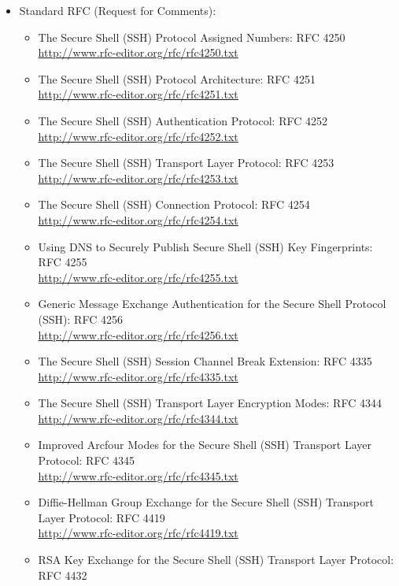\begin{itemize}
\begin{itemize}
\item Standard RFC (Request for Comments): \\
\begin{itemize}
\item The Secure Shell (SSH) Protocol Assigned Numbers: RFC 4250\\
\url{http://www.rfc-editor.org/rfc/rfc4250.txt}
\item The Secure Shell (SSH) Protocol Architecture: RFC 4251\\
\url{http://www.rfc-editor.org/rfc/rfc4251.txt}
\item The Secure Shell (SSH) Authentication Protocol: RFC 4252\\
\url{http://www.rfc-editor.org/rfc/rfc4252.txt}
\item The Secure Shell (SSH) Transport Layer Protocol: RFC 4253\\
\url{http://www.rfc-editor.org/rfc/rfc4253.txt}
\item The Secure Shell (SSH) Connection Protocol: RFC 4254\\
\url{http://www.rfc-editor.org/rfc/rfc4254.txt}
\item Using DNS to Securely Publish Secure Shell (SSH) Key Fingerprints: RFC 4255\\
\url{http://www.rfc-editor.org/rfc/rfc4255.txt}
\item Generic Message Exchange Authentication for the Secure Shell Protocol (SSH): RFC 4256\\
\url{http://www.rfc-editor.org/rfc/rfc4256.txt}
\item The Secure Shell (SSH) Session Channel Break Extension: RFC 4335\\
\url{http://www.rfc-editor.org/rfc/rfc4335.txt}
\item The Secure Shell (SSH) Transport Layer Encryption Modes: RFC 4344\\
\url{http://www.rfc-editor.org/rfc/rfc4344.txt}
\item Improved Arcfour Modes for the Secure Shell (SSH) Transport 
Layer Protocol: RFC 4345\\
\url{http://www.rfc-editor.org/rfc/rfc4345.txt}
\item Diffie-Hellman Group Exchange for the Secure Shell (SSH) 
Transport Layer Protocol: RFC 4419\\
\url{http://www.rfc-editor.org/rfc/rfc4419.txt}
\item RSA Key Exchange for the Secure Shell (SSH) Transport Layer 
Protocol: RFC 4432\\

\end{itemize}
\end{itemize}
\end{itemize}
